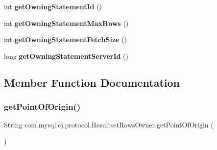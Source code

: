 \begin{DoxyCompactItemize}
\item 
\mbox{\label{interfacecom_1_1mysql_1_1cj_1_1protocol_1_1_resultset_rows_owner_ad896e6bd0af502d4fddc3938b3193953}} 
int {\bfseries get\+Owning\+Statement\+Id} ()
\item 
\mbox{\label{interfacecom_1_1mysql_1_1cj_1_1protocol_1_1_resultset_rows_owner_aede3182d876d3c1806e1240805162ea2}} 
int {\bfseries get\+Owning\+Statement\+Max\+Rows} ()
\item 
\mbox{\label{interfacecom_1_1mysql_1_1cj_1_1protocol_1_1_resultset_rows_owner_af003a626e00ebe4267a97322257bac67}} 
int {\bfseries get\+Owning\+Statement\+Fetch\+Size} ()
\item 
\mbox{\label{interfacecom_1_1mysql_1_1cj_1_1protocol_1_1_resultset_rows_owner_a1f6631c7c96a5ea02755ef4e2605916d}} 
long {\bfseries get\+Owning\+Statement\+Server\+Id} ()
\end{DoxyCompactItemize}


\subsection{Member Function Documentation}
\mbox{\label{interfacecom_1_1mysql_1_1cj_1_1protocol_1_1_resultset_rows_owner_ae8c8b074a381de4bf3b25dc53e4ee079}} 
\subsubsection{\texorpdfstring{get\+Point\+Of\+Origin()}{getPointOfOrigin()}}
{\footnotesize\ttfamily String com.\+mysql.\+cj.\+protocol.\+Resultset\+Rows\+Owner.\+get\+Point\+Of\+Origin (\begin{DoxyParamCaption}{ }\end{DoxyParamCaption})}

